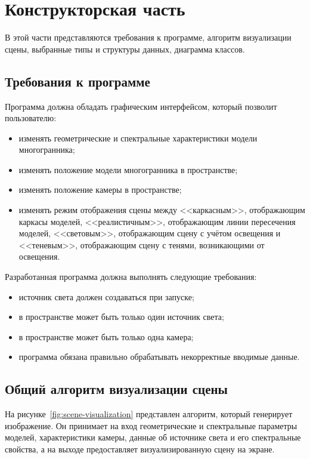 \chapter{Конструкторская часть}

В этой части представляются требования к программе, алгоритм визуализации сцены, выбранные типы и структуры данных, диаграмма классов.

\section{Требования к программе}

Программа должна обладать графическим интерфейсом, который позволит пользователю:
\begin{itemize}[label=--]
	\item изменять геометрические и спектральные характеристики модели многогранника;
	\item изменять положение модели многогранника в пространстве;
	\item изменять положение камеры в пространстве;
	\item изменять режим отображения сцены между <<каркасным>>, отображающим каркасы моделей, <<реалистичным>>, отображающим линии пересечения моделей, <<световым>>, отображающим сцену с учётом освещения и <<теневым>>, отображающим сцену с тенями, возникающими от освещения.
\end{itemize}

Разработанная программа должна выполнять следующие требования:
\begin{itemize}[label=--]
	\item источник света должен создаваться при запуске;
	\item в пространстве может быть только один источник света;
	\item в пространстве может быть только одна камера;
	\item программа обязана правильно обрабатывать некорректные вводимые данные.
\end{itemize}

\section{Общий алгоритм визуализации сцены}

На рисунке~\ref{fig:scene-visualization} представлен алгоритм, который генерирует изображение. Он принимает на вход геометрические и спектральные параметры моделей, характеристики камеры, данные об источнике света и его спектральные свойства, а на выходе предоставляет визуализированную сцену на экране.

